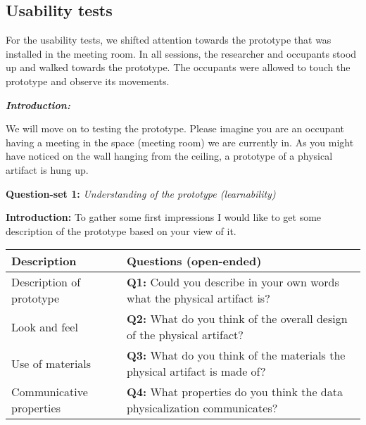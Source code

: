 \begin{appendices}
\newpage

\section{Usability tests}
\label{appendix:usability}

For the usability tests, we shifted attention towards the prototype that was installed in the meeting room. In all sessions, the researcher and occupants stood up and walked towards the prototype. The occupants were allowed to touch the prototype and observe its movements.
\vspace{5pt}

\textit{\textbf{Introduction:}}

We will move on to testing the prototype. Please imagine you are an occupant having a meeting in the space (meeting room) we are currently in. As you might have noticed on the wall hanging from the ceiling, a prototype of a physical artifact is hung up.\\

\begin{table}[htbp]
    \captionsetup{justification=raggedright,singlelinecheck=false}
    \raggedright \textbf{Question-set 1:} \textit{Understanding of the prototype (learnability)} \\
    \raggedright \textbf{Introduction:} To gather some first impressions I would like to get some description of the prototype based on your view of it.
    \label{tab:column_widths}
    \begin{tabularx}{\textwidth}{|p{}|X|}
        \hline
        \textbf{Description} & \textbf{Questions (open-ended)} \\
        \hline
        Description of prototype & \textbf{Q1:} Could you describe in your own words what the physical artifact is? \\
        \hline
        Look and feel & 
        \textbf{Q2:} What do you think of the overall design of the physical artifact? \\
        \hline
        Use of materials & 
        \textbf{Q3:} What do you think of the materials the physical artifact is made of? \\
        \hline
        Communicative properties & 
        \textbf{Q4:} What properties do you think the data physicalization communicates?\\
        \hline        
    \end{tabularx}
\end{table}


\end{appendices}
